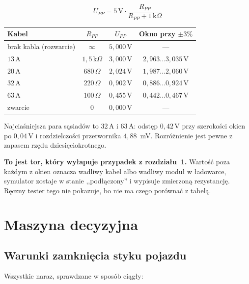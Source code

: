 \documentclass[a4paper,11pt]{article}
\newcommand{\ohm}{\,\Omega}
\newcommand{\kohm}{\,\mathrm{k}\Omega}
\newcommand{\volt}{\,\mathrm{V}}
\newcommand{\amp}{\,\mathrm{A}}
\begin{document}
\begin{equation}
U_{PP}=5\volt\cdot\frac{R_{PP}}{R_{PP}+1\kohm}
\end{equation}

\begin{center}
\begin{tabular}{lccc}
\toprule
Kabel & $R_{PP}$ & $U_{PP}$ & Okno przy $\pm3\%$ \\
\midrule
brak kabla (rozwarcie) & $\infty$        & $5{,}000\volt$ & --- \\
$13\amp$               & $1{,}5\kohm$    & $3{,}000\volt$ & $2{,}963\ldots3{,}035\volt$ \\
$20\amp$               & $680\ohm$       & $2{,}024\volt$ & $1{,}987\ldots2{,}060\volt$ \\
$32\amp$               & $220\ohm$       & $0{,}902\volt$ & $0{,}886\ldots0{,}924\volt$ \\
$63\amp$               & $100\ohm$       & $0{,}455\volt$ & $0{,}442\ldots0{,}467\volt$ \\
zwarcie                & $0$             & $0{,}000\volt$ & --- \\
\bottomrule
\end{tabular}
\end{center}

Najciaśniejsza para sąsiadów to $32\amp$ i $63\amp$: odstęp $0{,}42\volt$ przy
szerokości okien po $0{,}04\volt$ i rozdzielczości przetwornika $4{,}88$~mV.
Rozróżnienie jest pewne z zapasem rzędu dziesięciokrotnego.

\textbf{To jest tor, który wyłapuje przypadek z rozdziału~1.} Wartość poza każdym
z okien oznacza wadliwy kabel albo wadliwy moduł w ładowarce, symulator zostaje
w stanie ,,podłączony'' i wypisuje zmierzoną rezystancję. Ręczny tester tego nie
pokazuje, bo nie ma czego porównać z tabelą.

\section{Maszyna decyzyjna}
\label{sec:maszyna}

\subsection{Warunki zamknięcia styku pojazdu}

Wszystkie naraz, sprawdzane w sposób ciągły:
\end{document}
